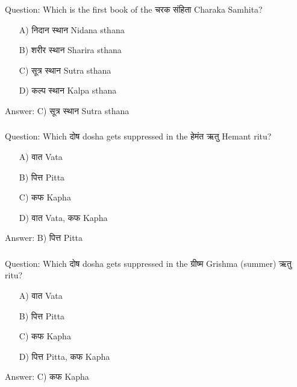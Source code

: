 \begin{frame}[fragile]\frametitle{}

Question: Which is the first book of the चरक संहिता Charaka Samhita?

\begin{itemize}
\item[A)] निदान स्थान Nidana sthana
\item[B)] शरीर स्थान Sharira sthana
\item[C)] सूत्र स्थान Sutra sthana
\item[D)] कल्प स्थान Kalpa sthana
\end{itemize}

Answer: C) सूत्र स्थान Sutra sthana
\end{frame}

\begin{frame}[fragile]\frametitle{}

Question: Which दोष dosha gets suppressed in the हेमंत ऋतु Hemant ritu?

\begin{itemize}
\item[A)] वात Vata
\item[B)] पित्त Pitta
\item[C)] कफ Kapha
\item[D)] वात Vata, कफ Kapha
\end{itemize}

Answer: B) पित्त Pitta
\end{frame}

\begin{frame}[fragile]\frametitle{}

Question: Which दोष dosha gets suppressed in the ग्रीष्म Grishma (summer) ऋतु ritu?

\begin{itemize}
\item[A)] वात Vata
\item[B)] पित्त Pitta
\item[C)] कफ Kapha
\item[D)] पित्त Pitta, कफ Kapha
\end{itemize}

Answer: C) कफ Kapha
\end{frame}

